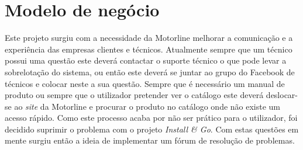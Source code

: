 \section{Modelo de negócio}

Este projeto surgiu com a necessidade da Motorline melhorar a comunicação e a experiência das 
empresas clientes e técnicos. Atualmente sempre que um técnico possui uma questão este deverá contactar o suporte técnico o que pode levar a sobrelotação do sistema, ou então este deverá se juntar ao grupo do Facebook de técnicos e colocar neste a sua questão. Sempre que é necessário um manual de produto ou sempre que o utilizador pretender ver o catálogo este deverá deslocar-se ao \textit{site} da Motorline e procurar o produto no catálogo onde não existe um acesso rápido.
Como este processo acaba por não ser prático para o utilizador, foi decidido suprimir o problema com o projeto \textit{Install \& Go}. Com estas questões em mente surgiu então 
a ideia de implementar um fórum de resolução de problemas.
